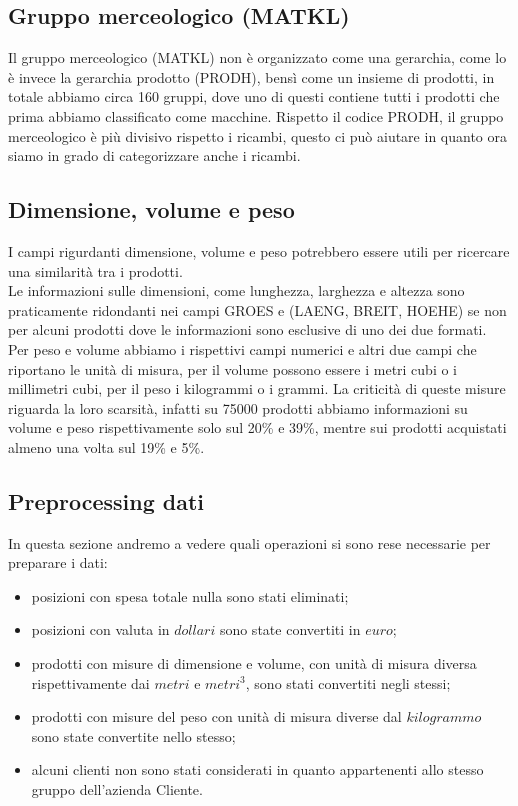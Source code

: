 \subsection{Gruppo merceologico (MATKL)}
Il gruppo merceologico (MATKL) non è organizzato come una gerarchia, come lo è invece la gerarchia prodotto (PRODH), bensì come un insieme di prodotti, in totale abbiamo circa 160 gruppi, dove uno di questi contiene tutti i prodotti che prima abbiamo classificato come macchine. Rispetto il codice PRODH, il gruppo merceologico è più divisivo rispetto i ricambi, questo ci può aiutare in quanto ora siamo in grado di categorizzare anche i ricambi. 

\subsection{Dimensione, volume e peso}
I campi rigurdanti dimensione, volume e peso potrebbero essere utili per ricercare una similarità tra i prodotti.\\
Le informazioni sulle dimensioni, come lunghezza, larghezza e altezza sono praticamente ridondanti nei campi GROES e (LAENG, BREIT, HOEHE) se non per alcuni prodotti dove le informazioni sono esclusive di uno dei due formati.\\
Per peso e volume abbiamo i rispettivi campi numerici e altri due campi che riportano le unità di misura, per il volume possono essere i metri cubi o i millimetri cubi, per il peso i kilogrammi o i grammi.
La criticità di queste misure riguarda la loro scarsità, infatti su 75000 prodotti abbiamo informazioni su volume e peso rispettivamente solo sul 20\% e 39\%, mentre sui prodotti acquistati almeno una volta sul 19\% e 5\%. 

\subsection{Preprocessing dati}
In questa sezione andremo a vedere quali operazioni si sono rese necessarie per preparare i dati:
\begin{itemize}
	\item posizioni con spesa totale nulla sono stati eliminati;
	\item posizioni con valuta in $dollari$ sono state convertiti in $euro$;
	\item prodotti con misure di dimensione e volume, con unità di misura diversa rispettivamente dai $metri$ e $metri^3$, sono stati convertiti negli stessi;
	\item prodotti con misure del peso con unità di misura diverse dal $kilogrammo$ sono state convertite nello stesso;
	\item alcuni clienti non sono stati considerati in quanto appartenenti allo stesso gruppo dell'azienda Cliente.
\end{itemize}